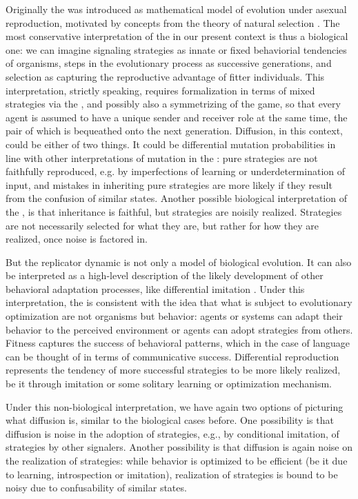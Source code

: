Originally the \rd was introduced as mathematical model of evolution
under asexual reproduction, motivated by concepts from the theory of
natural selection \citep{TaylorJonker1978:Evolutionary-St}. The most
conservative interpretation of the \rdd in our present context is thus
a biological one: we can imagine signaling strategies as innate or
fixed behaviorial tendencies of organisms, steps in the evolutionary
process as successive generations, and selection as capturing the
reproductive advantage of fitter individuals. This interpretation,
strictly speaking, requires formalization in terms of mixed strategies
via the \rmd, and possibly also a symmetrizing of the game, so that
every agent is assumed to have a unique sender and receiver role at
the same time, the pair of which is bequeathed onto the next
generation. Diffusion, in this context, could be either of two
things. It could be differential mutation probabilities in line with
other interpretations of mutation in the \rmd
\citep[e.g.][]{NowakKomarova2001:Evolution-of-Un,KomarovaNiyogi2001:The-Evolutionar}:
pure strategies are not faithfully reproduced, e.g. by imperfections
of learning or underdetermination of input, and mistakes in
inheriting pure strategies are more likely if they result from the
confusion of similar states. Another possible biological
interpretation of the \rdd, is that inheritance is faithful, but
strategies are noisily realized. Strategies are not necessarily
selected for what they are, but rather for how they are realized, once
noise is factored in.

But the replicator dynamic is not only a model of biological
evolution. It can also be interpreted as a high-level description of
the likely development of other behavioral adaptation processes, like
differential imitation \citep[see][for various derivations of the
\rd]{Sandholm2013:Population-Game}. Under this interpretation, the \rd
is consistent with the idea that what is subject to evolutionary
optimization are not organisms but behavior: agents or systems can
adapt their behavior to the perceived environment or agents can adopt
strategies from others. Fitness captures the success of behavioral
patterns, which in the case of language can be thought of in terms of
communicative success.  Differential reproduction represents the
tendency of more successful strategies to be more likely realized, be
it through imitation or some solitary learning or optimization
mechanism.

Under this non-biological interpretation, we have again two options of
picturing what diffusion is, similar to the biological cases
before. One possibility is that diffusion is noise in the adoption of
strategies, e.g., by conditional imitation, of strategies by other
signalers. Another possibility is that diffusion is again noise on the
realization of strategies: while behavior is optimized to be efficient
(be it due to learning, introspection or imitation), realization of
strategies is bound to be noisy due to confusability of similar
states.

